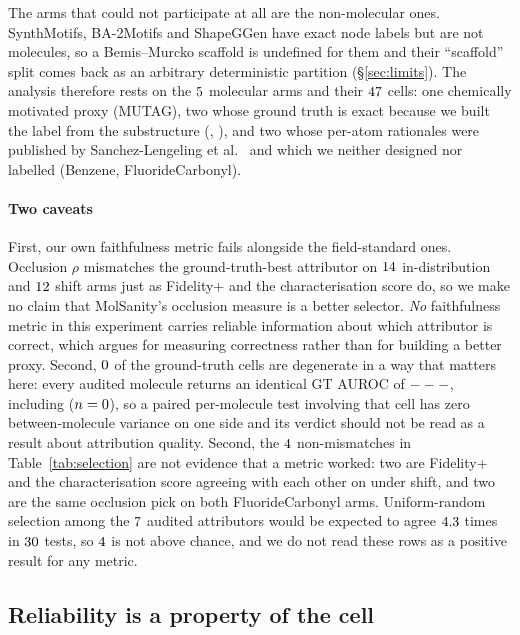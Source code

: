 The arms that could not participate at all are the non-molecular ones.
SynthMotifs, BA-2Motifs and ShapeGGen have exact node labels but are not
molecules, so a Bemis--Murcko scaffold is undefined for them and their
``scaffold'' split comes back as an arbitrary deterministic partition
(\S\ref{sec:limits}). The analysis therefore rests on the
$5{}$ molecular arms and their $47{}$ cells: one
chemically motivated proxy (MUTAG), two whose ground truth is exact because we
built the label from the substructure (\molDataset{}, \hardDataset{}), and two
whose per-atom rationales were published by
Sanchez-Lengeling et al.~\cite{sanchez2020} and which we neither designed nor
labelled (Benzene, FluorideCarbonyl).

\paragraph{Two caveats} First, our own faithfulness metric fails alongside the
field-standard ones. Occlusion $\rho$ mismatches the ground-truth-best
attributor on $14{}$ in-distribution and
$12{}$ shift arms just as Fidelity+ and the characterisation
score do, so we make no claim that MolSanity's occlusion measure is a better
selector. \emph{No} faithfulness metric in this experiment carries reliable
information about which attributor is correct, which argues for measuring
correctness rather than for building a better proxy.
\ifHasDegenerateCells
Second, $0{}$
of the ground-truth cells are degenerate in a way that matters here: every
audited molecule returns an identical GT AUROC of $---{}$, including
\degenCell{} ($n=0{}$), so a paired per-molecule test involving that cell
has zero between-molecule variance on one side and its verdict should not be
read as a result about attribution quality.
\else
Second, the $4{}$ non-mismatches in Table~\ref{tab:selection} are not
evidence that a metric worked: two are Fidelity+ and the characterisation score
agreeing with each other on \hardDataset{} under shift, and two are the same
occlusion pick on both FluorideCarbonyl arms.\ifHasSelChance{} Uniform-random
selection among the $7{}$ audited attributors would be expected to
agree $4.3{}$ times in $30{}$ tests, so
$4{}$ is not above chance\fi{}, and we do not read these rows as a
positive result for any metric.
\fi

\subsection{Reliability is a property of the cell}
\label{sec:cell}


